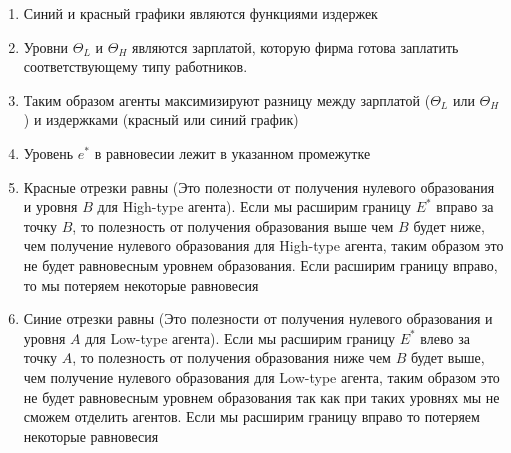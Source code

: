 \begin{enumerate}
    \item Синий и красный графики являются функциями издержек
    \item Уровни $\Theta_L$ и $\Theta_H$ являются зарплатой, которую фирма готова заплатить соответствующему типу работников.
    \item Таким образом агенты максимизируют разницу между зарплатой ($\Theta_L$ или $\Theta_H$) и издержками (красный или синий график)
    \item Уровень $e^*$ в равновесии лежит в указанном промежутке
    \item Красные отрезки равны (Это полезности от получения нулевого образования и уровня $B$ для High-type агента).
    Если мы расширим границу $E^*$ вправо за точку $B$, то полезность от получения образования выше чем $B$ будет ниже, чем получение
    нулевого образования для High-type агента, таким образом это не будет равновесным уровнем образования. Если расширим границу вправо,
    то мы потеряем некоторые равновесия
    \item Синие отрезки равны (Это полезности от получения нулевого образования и уровня $A$ для Low-type агента). Если
    мы расширим границу $E^*$ влево за точку $A$, то полезность от получения образования ниже чем $B$ будет выше, чем
    получение нулевого образования для Low-type агента, таким образом это не будет равновесным уровнем образования так
    как при таких уровнях мы не сможем отделить агентов. Если мы расширим границу вправо то потеряем некоторые
    равновесия
\end{enumerate}

